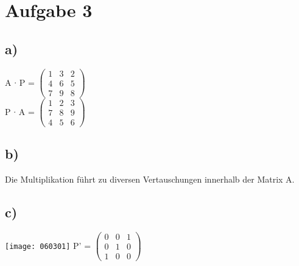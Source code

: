 \documentclass{article}
\begin{document}
	\section*{Aufgabe 3}
	\subsection*{a)}
	A $\cdot$ P = $
	\left(\begin{array}{ccc}
	1 & 3 & 2 \\ 4 & 6 & 5 \\ 7 & 9 & 8
	\end{array}\right)
	$ \\
	P $\cdot$ A = $
	\left(\begin{array}{ccc}
	1 & 2 & 3 \\ 7 & 8 & 9 \\ 4 & 5 & 6
	\end{array}\right)
	$
	\subsection*{b)}
	Die Multiplikation führt zu diversen Vertauschungen innerhalb der Matrix A.
	\subsection*{c)}
	\texttt{[image: 060301]}
	P'  = $
	\left(\begin{array}{ccc}
	 0 & 0 & 1 \\ 0 & 1 & 0 \\ 1 & 0 & 0 
	\end{array}\right)
	$
\end{document}
